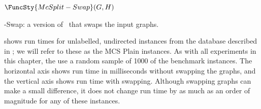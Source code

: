\begin{algorithm}[h!]
\AlgorithmFontSizeB
\DontPrintSemicolon
\nl $\FuncSty{McSplit-Swap}(G, H)$ \label{McSplitSwapFun} \;
\nl {}
    \caption{\McSplit-Swap: a version of \McSplit\ that swaps the input graphs.} 
\label{McSplitSwapAlg}
\end{algorithm}

 shows run times for unlabelled,
undirected instances from the database described in
; we will refer to these as the MCS Plain
instances.  As with all experiments in this chapter, the   use a
random sample of 1000 of the benchmark instances.  The horizontal axis shows
run time in milliseconds without swapping the graphs, and the vertical axis
shows run time with swapping.  Although swapping graphs can make a small
difference, it does not change run time by as much as an order of magnitude for
any of these instances.

